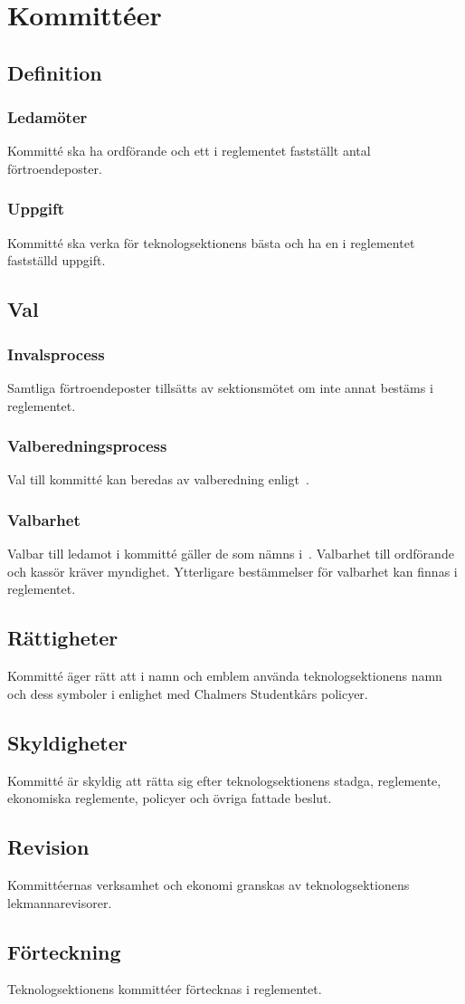 \section{Kommittéer}
\subsection{Definition}
\subsubsection{Ledamöter}
Kommitté ska ha ordförande och ett i reglementet fastställt antal förtroendeposter.

\subsubsection{Uppgift}
Kommitté ska verka för teknologsektionens bästa och ha en i reglementet fastställd uppgift.

\subsection{Val}
\subsubsection{Invalsprocess}
Samtliga förtroendeposter tillsätts av sektionsmötet om inte annat bestäms i reglementet.
\subsubsection{Valberedningsprocess}
Val till kommitté kan beredas av valberedning enligt~.

\subsubsection{Valbarhet}
Valbar till ledamot i kommitté gäller de som nämns i~.
Valbarhet till ordförande och kassör kräver myndighet.
Ytterligare bestämmelser för valbarhet kan finnas i reglementet.

\subsection{Rättigheter}
Kommitté äger rätt att i namn och emblem använda teknologsektionens namn och dess symboler i enlighet med Chalmers Studentkårs policyer.
\subsection{Skyldigheter}
Kommitté är skyldig att rätta sig efter teknologsektionens stadga, reglemente, ekonomiska reglemente, policyer och övriga fattade beslut.
\subsection{Revision}
Kommittéernas verksamhet och ekonomi granskas av teknologsektionens lekmannarevisorer.
\subsection{Förteckning}
Teknologsektionens kommittéer förtecknas i reglementet.
